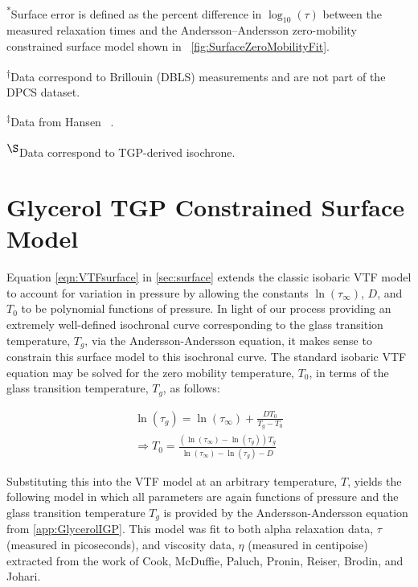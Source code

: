 \noindent\textsuperscript{*}Surface error is defined as the percent difference in $\log_{10}(\tau)$ between the measured relaxation times and the Andersson--Andersson zero-mobility constrained surface model shown in \fig~\ref{fig:SurfaceZeroMobilityFit}.

\noindent\textsuperscript{$\dagger$}Data correspond to Brillouin (DBLS) measurements and are not part of the DPCS dataset.

\noindent\textsuperscript{$\ddagger$}Data from Hansen \etal\ \cite{Hansen2018Fragility}.

\noindent\textsuperscript{$\S$}Data correspond to TGP-derived isochrone.

\chapter{Glycerol TGP Constrained Surface Model}  \label{app:AndersonSurface}

Equation \ref{eqn:VTFsurface} in \sect \ref{sec:surface} extends the classic isobaric VTF model to account for variation in pressure by allowing the constants $\ln(\tau_{\infty})$, $D$, and $T_{0}$ to be polynomial functions of pressure.  In light of our \tgp process providing an extremely well-defined isochronal curve corresponding to the glass transition temperature, $T_g$, via the Andersson-Andersson equation, it makes sense to constrain this surface model to this isochronal curve\cite{Andersson}.  The standard isobaric VTF equation may be solved for the zero mobility temperature, $T_0$, in terms of the glass transition temperature, $T_g$, as follows:

\begin{equation}
	\begin{split}
		\ln(\tau_g)=\ln(\tau_{\infty}) +\frac{D T_{0}}{T_g-T_{0}}\\
		\Rightarrow T_0=\frac{\left ( \ln(\tau_{\infty})-\ln(\tau_g)\right ) T_g}{\ln(\tau_{\infty})-\ln(\tau_g)-D}
	\end{split}
\end{equation}

Substituting this into the VTF model at an arbitrary temperature, $T$, yields the following model in which all parameters are again functions of pressure and the glass transition temperature $T_g$ is provided by the Andersson-Andersson equation from \app \ref{app:GlycerolIGP}.  This model was fit to both alpha relaxation data, $\tau$ (measured in picoseconds), and viscosity data, $\eta$ (measured in centipoise) extracted from the work of Cook, McDuffie, Paluch, Pronin, Reiser, Brodin, and Johari\cite{Cook2,McDuffie,Paluch,Pronin,Reiser,Brodin,Johari}. 


